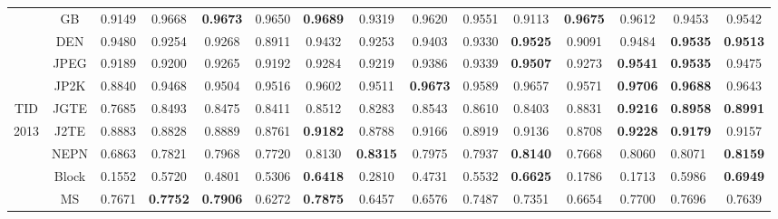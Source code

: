 \begin{table*}[htb]
\begin{tabular}{ccccccccccccccc}
                      & GB    & 0.9149          & 0.9668 & \textbf{0.9673}          & 0.9650          & \textbf{0.9689} & 0.9319          & 0.9620          & 0.9551          & 0.9113          & \textbf{0.9675} & 0.9612          & 0.9453 & 0.9542                              \\
                      & DEN   & 0.9480 & 0.9254          & 0.9268          & 0.8911          & 0.9432          & 0.9253          & 0.9403          & 0.9330          & \textbf{0.9525}          & 0.9091          & 0.9484 & \textbf{0.9535} & \textbf{0.9513}                     \\
                      & JPEG  & 0.9189          & 0.9200          & 0.9265          & 0.9192          & 0.9284          & 0.9219          & 0.9386          & 0.9339          & \textbf{0.9507} & 0.9273          & \textbf{0.9541} & \textbf{0.9535} & 0.9475                     \\
                      & JP2K  & 0.8840          & 0.9468          & 0.9504          & 0.9516          & 0.9602          & 0.9511          & \textbf{0.9673} & 0.9589          & 0.9657          & 0.9571          & \textbf{0.9706} & \textbf{0.9688} & 0.9643                     \\
TID                   & JGTE  & 0.7685          & 0.8493          & 0.8475          & 0.8411          & 0.8512          & 0.8283          & 0.8543          & 0.8610          & 0.8403          & 0.8831 & \textbf{0.9216} & \multicolumn{1}{l}{\textbf{0.8958}} & \textbf{0.8991} \\
2013                  & J2TE  & 0.8883          & 0.8828          & 0.8889          & 0.8761          & \textbf{0.9182} & 0.8788          & 0.9166          & 0.8919          & 0.9136          & 0.8708          & \textbf{0.9228} & \multicolumn{1}{l}{\textbf{0.9179}} & 0.9157 \\
                      & NEPN  & 0.6863          & 0.7821          & 0.7968          & 0.7720          & 0.8130 & \textbf{0.8315} & 0.7975          & 0.7937          & \textbf{0.8140} & 0.7668          & 0.8060          & \multicolumn{1}{l}{0.8071} & \textbf{0.8159}          \\
                      & Block & 0.1552          & 0.5720          & 0.4801          & 0.5306          & \textbf{0.6418} & 0.2810          & 0.4731          & 0.5532          & \textbf{0.6625} & 0.1786          & 0.1713          & \multicolumn{1}{l}{0.5986} & \textbf{0.6949} \\
                      & MS    & 0.7671          & \textbf{0.7752}          & \textbf{0.7906} & 0.6272          & \textbf{0.7875} & 0.6457          & 0.6576          & 0.7487          & 0.7351          & 0.6654          & 0.7700          & \multicolumn{1}{l}{0.7696} & 0.7639          \\

\end{tabular}
\end{table*}
